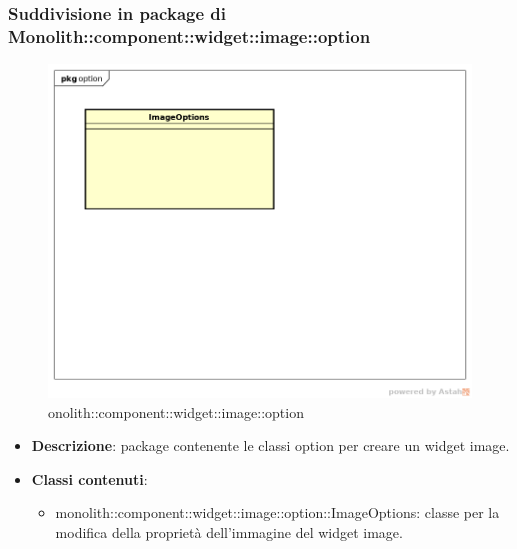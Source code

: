 \subsubsection{Suddivisione in package  di Monolith::component::widget::image::option}
\label{onolith::component::widget::image::option}
\begin{figure}[H]
	\centering
	\includegraphics[scale=0.5]{Sezioni/imgPackage/component_widget_image_option.png}
	\caption{onolith::component::widget::image::option}
\end{figure}
\begin{itemize}
	\item{\textbf{Descrizione}}: package contenente le classi option per creare un widget image.
	\item{\textbf{Classi contenuti}}:
	\begin{itemize}
	\item{monolith::component::widget::image::option::ImageOptions}: classe per la modifica della proprietà dell'immagine del widget image.
	\end{itemize}
\end{itemize}


